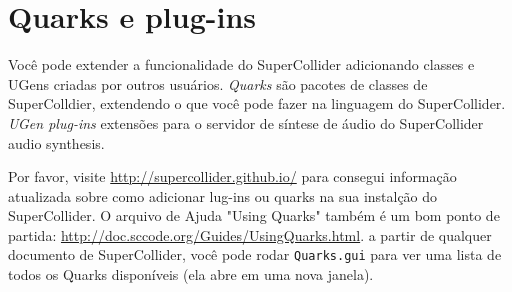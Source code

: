 \section{Quarks e plug-ins}

Você pode extender a funcionalidade do SuperCollider adicionando classes e UGens criadas por outros usuários. \emph{Quarks} são pacotes de classes de SuperColldier, extendendo o que você pode fazer na linguagem do SuperCollider. \emph{UGen plug-ins} extensões para o servidor de síntese de áudio do SuperCollider audio synthesis.

Por favor, visite \url{http://supercollider.github.io/} para consegui informação atualizada sobre como adicionar lug-ins ou quarks na sua instalção do SuperCollider. O arquivo de Ajuda "Using Quarks" também é um bom ponto de partida: \url{http://doc.sccode.org/Guides/UsingQuarks.html}. a partir de qualquer documento de SuperCollider, você pode rodar \texttt{Quarks.gui} para ver uma lista de todos os Quarks disponíveis (ela abre em uma nova janela).
